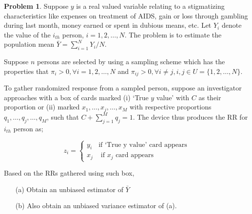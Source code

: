 \documentclass[12pt]{article}
\theoremstyle{definition}
\newtheorem*{prb}{Problem}
\newenvironment{problem}{
\begin{tcolorbox}[colback=blue!5!white,colframe=blue!75!black, parbox = true] \begin{prb}  }{\end{prb}\end{tcolorbox} }
\begin{document}
\begin{problem}
	Suppose $y$ is a real valued variable relating to a stigmatizing characteristics like expenses on treatment of AIDS, gain or loss through gambling during last month, money earned or spent in dubious means, etc. Let $Y_i$ denote the value of the $i_{th}$ person, $i=1,2,\ldots,N$. The problem is to estimate the population mean $\bar{Y} = \sum_{i=1}^N Y_i / N $. 

	Suppose $n$ persons are selected by using a sampling scheme which has the properties that $\pi_i > 0, \forall i = 1,2,\ldots, N$ and $\pi_{ij} > 0 , \forall i \neq j, i,j \in U=\{1,2,\ldots,N \}$. 

	To gather randomized response from a sampled person, suppose an investigator approaches with a box of cards marked (i) `True $y$ value' with $C$ as their proportion or (ii) marked $x_1, \ldots, x_j, \ldots, x_M$ with respective proportions $q_1, \ldots, q_j, \ldots, q_M$, such that $C + \sum_{j=1}^M q_j = 1$. The device thus produces the RR for $i_{th}$ person as;

	$$
	z_i = \begin{cases}
		y_i & \text{if `True y value' card appears}\\
		x_j & \text{ if } x_j \text{ card appears}
	\end{cases}
	$$
\end{problem}
 
Based on the  RRs gathered using such box, 

\begin{enumerate}
	\item[(a)] Obtain an unbiased estimator of $\bar{Y}$
	\item[(b)] Also obtain an unbiased variance estimator of (a).
\end{enumerate}
\end{document}
